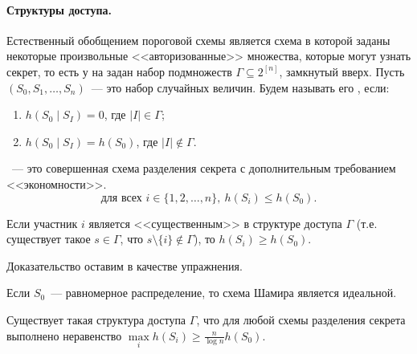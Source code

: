 \paragraph{Структуры доступа.} Естественный обобщением пороговой схемы является схема в которой заданы
некоторые произвольные <<авторизованные>> множества, которые могут узнать секрет, то есть у на задан
набор подмножеств $\Gamma \subseteq 2^{[n]}$, замкнутый вверх. Пусть $(S_0, S_1, \dots, S_n)$~--- это
набор случайных величин. Будем называть его
, если:  
\begin{enumerate}
    \item $h(S_0 \mid S_I) = 0$, где $|I| \in \Gamma$;
    \item $h(S_0 \mid S_I) = h(S_0)$, где $|I| \notin \Gamma$.
\end{enumerate}

~--- это совершенная схема разделения секрета с
дополнительным требованием <<экономности>>.
$$
    \text{для всех } i \in \{1, 2, \dots, n\},\ h(S_i) \le h(S_0).
$$

\begin{lemma}
    Если участник $i$ является <<существенным>> в структуре доступа $\Gamma$ (т.е. существует такое
    $s \in \Gamma$, что $s \setminus \{i\} \notin \Gamma$), то $h(S_i) \ge h(S_0)$.
\end{lemma}

Доказательство оставим в качестве упражнения.
   
\begin{remark}
    Если $S_0$~--- равномерное распределение, то схема Шамира является идеальной.
\end{remark}

\begin{theorem}
    Существует такая структура доступа $\Gamma$, что для любой схемы разделения секрета выполнено
    неравенство $\max\limits_{i} h(S_i) \ge \frac{n}{\log n} h(S_0)$.
\end{theorem}